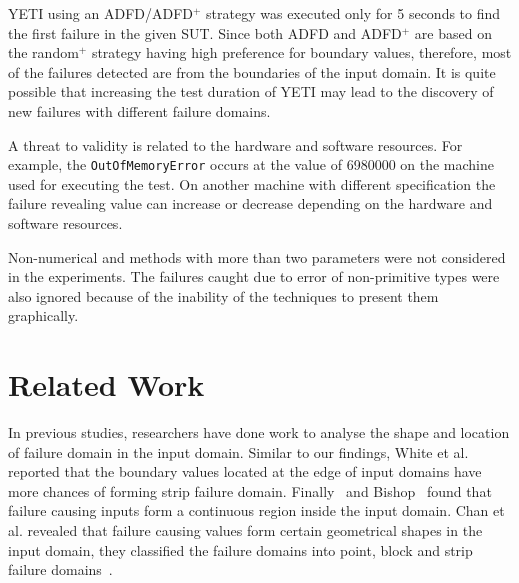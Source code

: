 YETI using an ADFD/ADFD$^+$ strategy was executed only for 5 seconds to find the first failure in the given SUT. Since both ADFD and ADFD$^+$ are based on the random$^+$ strategy having high preference for boundary values, therefore, most of the failures detected are from the boundaries of the input domain. It is quite possible that increasing the test duration of YETI may lead to the discovery of new failures with different failure domains.

A threat to validity is related to the hardware and software resources. For example, the \verb+OutOfMemoryError+ occurs at the value of 6980000 on the machine used for executing the test. On another machine with different specification the failure revealing value can increase or decrease depending on the hardware and software resources.

Non-numerical and methods with more than two parameters were not considered in the experiments. The failures caught due to error of non-primitive types were also ignored because of the inability of the techniques to present them graphically. 












\section{Related Work}
In previous studies, researchers have done work to analyse the shape and location of failure domain in the input domain. Similar to our findings, White et al.~\cite{white1980domain} reported that the boundary values located at the edge of input domains have more chances of forming strip failure domain. Finally~\cite{finelli1991nasa} and Bishop~\cite{bishop1993variation} found that failure causing inputs form a continuous region inside the input domain. Chan et al. revealed that failure causing values form certain geometrical shapes in the input domain, they classified the failure domains into point, block and strip failure domains~\cite{chan1996proportional}. 

